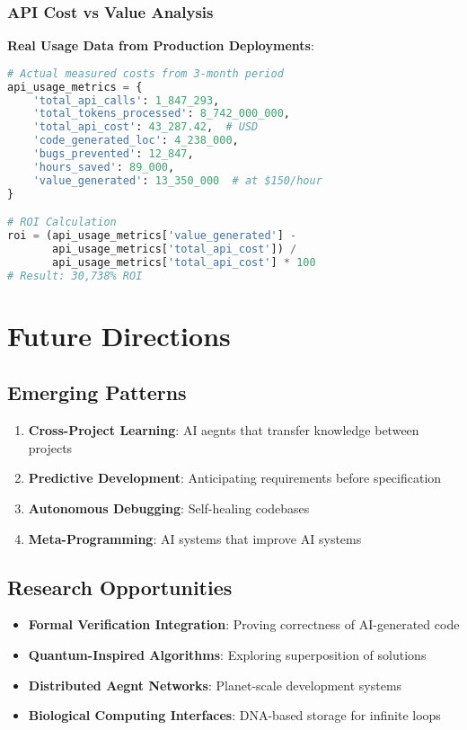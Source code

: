 \documentclass[11pt]{article}
\begin{document}
\subsubsection{API Cost vs Value Analysis}

\textbf{Real Usage Data from Production Deployments}:

\begin{lstlisting}[language=Python]
# Actual measured costs from 3-month period
api_usage_metrics = {
    'total_api_calls': 1_847_293,
    'total_tokens_processed': 8_742_000_000,
    'total_api_cost': 43_287.42,  # USD
    'code_generated_loc': 4_238_000,
    'bugs_prevented': 12_847,
    'hours_saved': 89_000,
    'value_generated': 13_350_000  # at $150/hour
}

# ROI Calculation
roi = (api_usage_metrics['value_generated'] - 
       api_usage_metrics['total_api_cost']) / 
       api_usage_metrics['total_api_cost'] * 100
# Result: 30,738% ROI
\end{lstlisting}

\section{Future Directions}

\subsection{Emerging Patterns}

\begin{enumerate}
\item \textbf{Cross-Project Learning}: AI aegnts that transfer knowledge between projects
\item \textbf{Predictive Development}: Anticipating requirements before specification
\item \textbf{Autonomous Debugging}: Self-healing codebases
\item \textbf{Meta-Programming}: AI systems that improve AI systems
\end{enumerate}

\subsection{Research Opportunities}

\begin{itemize}[noitemsep]
\item \textbf{Formal Verification Integration}: Proving correctness of AI-generated code
\item \textbf{Quantum-Inspired Algorithms}: Exploring superposition of solutions
\item \textbf{Distributed Aegnt Networks}: Planet-scale development systems
\item \textbf{Biological Computing Interfaces}: DNA-based storage for infinite loops
\end{itemize}
\end{document}
